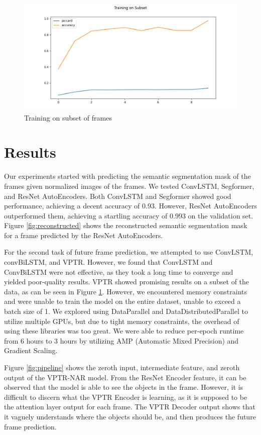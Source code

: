 \documentclass{article}
\begin{document}
\begin{figure}
  \centering
  \includegraphics[scale=0.3]{subset.png}
  \caption{Training on subset of frames}
  \label{fig:subset}
\end{figure}


\section{Results}
Our experiments started with predicting the semantic segmentation mask of the frames given
normalized images of the frames. We tested ConvLSTM, Segformer, and ResNet AutoEncoders. Both
ConvLSTM and Segformer showed good performance, achieving a decent accuracy of 0.93. However,
ResNet AutoEncoders outperformed them, achieving a startling accuracy of 0.993 on the validation
set. Figure \ref{fig:reconstructed} shows the reconstructed semantic segmentation mask for a
frame predicted by the ResNet AutoEncoders.

For the second task of future frame prediction, we attempted to use ConvLSTM, convBiLSTM, and
VPTR. However, we found that ConvLSTM and ConvBiLSTM were not effective, as they took a long time
to converge and yielded poor-quality results. VPTR showed promising results on a subset of the
data, as can be seen in Figure \ref{fig:subset}. However, we encountered memory constraints and
were unable to train the model on the entire dataset, unable to exceed a batch size of 1. We
explored using DataParallel and DataDistributedParallel to utilize multiple GPUs, but due to
tight memory constraints, the overhead of using these libraries was too great. We were able to
reduce per-epoch runtime from 6 hours to 3 hours by utilizing AMP (Automatic Mixed Precision)
and Gradient Scaling.

Figure \ref{fig:pipeline} shows the zeroth input, intermediate feature, and zeroth output of the
VPTR-NAR model. From the ResNet Encoder feature, it can be observed that the model is able to see
the objects in the frame. However, it is difficult to discern what the VPTR Encoder is learning,
as it is supposed to be the attention layer output for each frame. The VPTR Decoder output shows
that it vaguely understands where the objects should be, and then produces the future frame
prediction.
\end{document}
